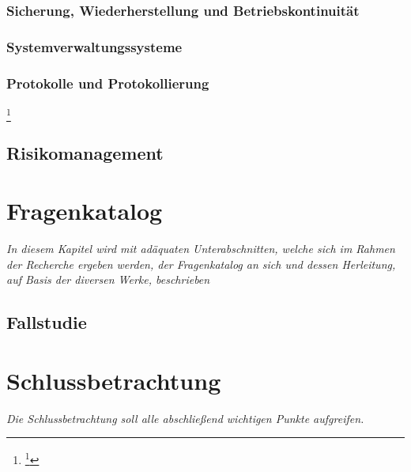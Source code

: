 \documentclass[11pt,a4paper,hidelinks]{article}   %
\begin{document}
            \subsubsection{Sicherung, Wiederherstellung und Betriebskonti­nuität}
            \subsubsection{Systemverwaltungssysteme}
            \subsubsection{Protokolle und Protokollierung}
            \footnote{
                \footcite[Vgl. S. 106 - 107][]{iso27002-2022}
            }
        \subsection{Risikomanagement}
    \section{Fragenkatalog}\label{sec:HerleitungDesFragenkatalog}
        \emph{In diesem Kapitel wird mit adäquaten Unterabschnitten, welche sich im Rahmen der Recherche ergeben werden, der Fragenkatalog an sich und dessen Herleitung, auf Basis der diversen Werke, beschrieben}
        
        \subsection{Fallstudie}


    \newpage
    \section{Schlussbetrachtung}
        \emph{Die Schlussbetrachtung soll alle abschließend wichtigen Punkte aufgreifen.}
\end{document}
